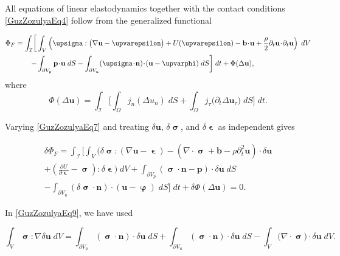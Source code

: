 All equations of linear elastodynamics together with the contact conditions \eqref{GuzZozulyaEq4}  
follow from the generalized functional

\begin{align}
	\Phi_{F}=
	\int_{\mathcal{I}}
	\biggl[
	&\int_{V}
	\left(
	\bm{\upsigma}:\bigl(\nabla\mathbf{u}- \bm{\upvarepsilon}\bigr)
	+U( \bm{\upvarepsilon})
	-\mathbf{b} \!\cdot\! \mathbf{u}
	+\frac{\rho}{2} \partial_{t}\mathbf{u} \!\cdot\! \partial_{t}\mathbf{u}
	\right)\;dV
	\notag \\
	- &\int_{\partial V_{p}} \mathbf{p} \!\cdot\! \mathbf{u} \;dS
	- \int_{\partial V_{u}} (\bm{\upsigma} \!\cdot\! \mathbf{n})\!\cdot\! (\mathbf{u}-\bm{\upvarphi}) \;dS
	\biggr]\;dt
	+\Phi(\Delta\mathbf{u}),
	\label{GuzZozulyaEq7} %
\end{align}
where
\begin{equation}\label{GuzZozulyaEq8} %
	\Phi(\Delta\mathbf{u})=
	\int_{\mathcal{I}}
	\biggl[
	\int_{\Omega} j_{n}(\Delta u_{n}) \;dS
	+
	\int_{\Omega} j_{\tau} \bigl(\partial_{t}\Delta \mathbf{u}_{\tau}\bigr) \;dS
	\biggr]\;dt.
\end{equation}

Varying \eqref{GuzZozulyaEq7} and treating $\delta\mathbf{u}$, $\delta\bm{\upsigma}$,  
and $\delta \bm{\upvarepsilon}$ as independent gives

\begin{equation}\label{GuzZozulyaEq9} %
	\begin{aligned}
		\delta\Phi_{F} =
		\int_{\mathcal{I}}
		\biggl[
		\int_{V}
		\biggl(
		\delta\bm{\upsigma}:(\nabla\mathbf{u}- \bm{\upvarepsilon})
		-\left(\nabla \!\cdot\! \bm{\upsigma}+\mathbf{b}-\rho \partial_{t}^{2}\mathbf{u}\right) \!\cdot\! \delta\mathbf{u}
		\\
		+\left(\frac{\partial U}{\partial \bm{\upvarepsilon}}-\bm{\upsigma}\right):\delta \bm{\upvarepsilon}
		\biggr)\;dV
		+\int_{\partial V_{p}}(\bm{\upsigma} \!\cdot\! \mathbf{n}-\mathbf{p}) \!\cdot\! \delta\mathbf{u} \;dS		
		\\
		-\int_{\partial V_{u}}(\delta\bm{\upsigma} \!\cdot\! \mathbf{n})\!\cdot\! (\mathbf{u}-\bm{\upvarphi}) \;dS
		\biggr]\;dt
		+\delta\Phi(\Delta\mathbf{u})=0.
	\end{aligned}
\end{equation}

In \eqref{GuzZozulyaEq9}, we have used

\begin{equation}\label{GuzZozulyaEq10} %
	\int_{V}\bm{\upsigma}:\nabla\delta\mathbf{u} \;dV
	=
	\int_{\partial V_{p}}(\bm{\upsigma}\!\cdot\!\mathbf{n}) \!\cdot\! \delta\mathbf{u}   \;dS
	+\int_{\partial V_{u}}(\bm{\upsigma}\!\cdot\!\mathbf{n}) \!\cdot\! \delta\mathbf{u} \;dS
	-\int_{V}\bigl(\nabla \!\cdot\! \bm{\upsigma}\bigr) \!\cdot\! \delta\mathbf{u} \;dV.
\end{equation}

